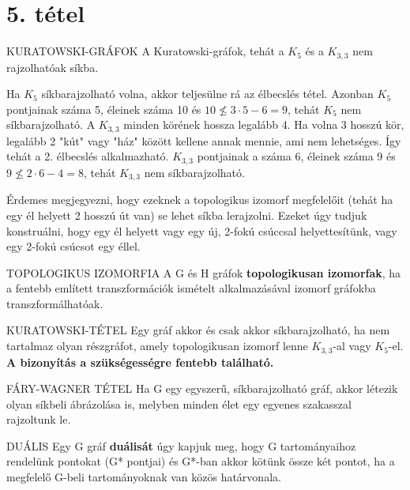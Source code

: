 \section{5. tétel}

\begin{tetel}{KURATOWSKI-GRÁFOK}
A Kuratowski-gráfok, tehát a $K_5$ és a $K_{3,3}$ nem rajzolhatóak síkba.
\end{tetel}

\begin{bizonyitas}{}
Ha $K_5$ síkbarajzolható volna, akkor teljesülne rá az élbecslés tétel. Azonban $K_5$ pontjainak száma 5, éleinek száma 10 és $10 \not\leq 3 \cdot 5 -6 = 9$, tehát $K_5$ nem síkbarajzolható.
A $K_{3,3}$ minden körének hossza legalább 4. Ha volna 3 hosszú kör, legalább 2 "kút" vagy "ház" között kellene annak mennie, ami nem lehetséges. Így tehát a 2. élbecslés alkalmazható. $K_{3,3}$ pontjainak a száma 6, éleinek száma 9 és $9 \not\leq 2 \cdot 6 - 4 = 8$, tehát $K_{3,3}$ nem síkbarajzolható.
\end{bizonyitas}

Érdemes megjegyezni, hogy ezeknek a topologikus izomorf megfelelőit (tehát ha egy él helyett 2 hosszú út van) se lehet síkba lerajzolni. Ezeket úgy tudjuk konstruálni, hogy egy él helyett vagy egy új, 2-fokú csúccsal helyettesítünk, vagy egy 2-fokú csúcsot egy éllel.

\begin{definicio}{TOPOLOGIKUS IZOMORFIA}
A G és H gráfok \textbf{topologikusan izomorfak}, ha a fentebb említett transzformációk ismételt alkalmazásával izomorf gráfokba transzformálhatóak.
\end{definicio}

\begin{tetel}{KURATOWSKI-TÉTEL}
Egy gráf akkor és csak akkor síkbarajzolható, ha nem tartalmaz olyan részgráfot, amely topologikusan izomorf lenne $K_{3,3}$-al vagy $K_5$-el. \textbf{A bizonyítás a szükségességre fentebb található.}
\end{tetel}

\begin{tetel}{FÁRY-WAGNER TÉTEL}
Ha G egy egyszerű, síkbarajzolható gráf, akkor létezik olyan síkbeli ábrázolása is, melyben minden élet egy egyenes szakasszal rajzoltunk le.
\end{tetel}

\begin{definicio}{DUÁLIS}
Egy G gráf \textbf{duálisát} úgy kapjuk meg, hogy G tartományaihoz rendelünk pontokat (G* pontjai) és G*-ban akkor kötünk össze két pontot, ha a megfelelő G-beli tartományoknak van közös határvonala.
\end{definicio}

